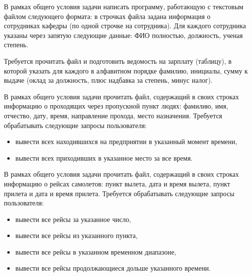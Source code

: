 
\begin{zztask}
В рамках общего условия задачи написать программу, работающую с текстовым файлом
следующего формата: в строчках файла задана информация 
о сотрудниках кафедры (по одной строчке на сотрудника). Для каждого сотрудника
указаны через запятую следующие данные:
ФИО полностью, должность, ученая степень.

Требуется прочитать файл и подготовить ведомость на зарплату (таблицу), в которой
указать для каждого в алфавитном порядке фамилию, инициалы, сумму к выдаче (оклад 
за должность, плюс надбавка за степень, минус налог).
\end{zztask}


\begin{zztask}
В рамках общего условия задачи прочитать файл, содержащий в своих строках
информацию о проходящих через пропускной пункт людях: фамилию, имя, отчество,
дату, время, направление прохода, место назначения. Требуется обрабатывать
следующие запросы пользователя:
%
\begin{itemize}
\item вывести всех находившихся на предприятии в указанный момент времени,
\item вывести всех приходивших в указанное место за все время.
\end{itemize}
\end{zztask}


\begin{zztask}
В рамках общего условия задачи прочитать файл, содержащий в своих строках
информацию о рейсах самолетов: пункт вылета, дата и время вылета, пункт
прилета и дата и время прилета. Требуется обрабатывать следующие запросы
пользователя:
%
\begin{itemize}
\item вывести все рейсы за указанное число,
\item вывести все рейсы из указанного пункта,
\item вывести все рейсы в указанном временном диапазоне,
\item вывести все рейсы продолжающиеся дольше указанного времени.
\end{itemize}
\end{zztask}

